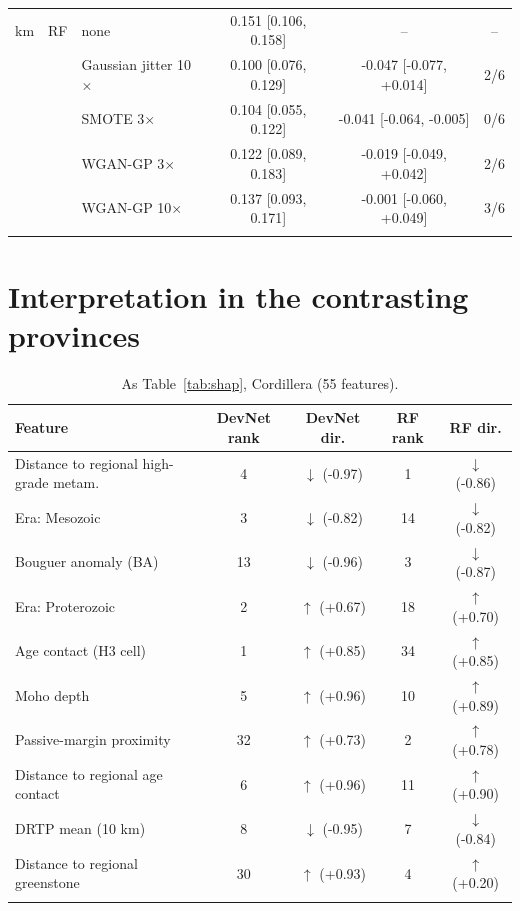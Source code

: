 \documentclass[pdflatex,sn-apa]{sn-jnl}
\begin{document}
\begin{appendices}
\begin{table}[!h]
\begin{tabular*}{\textwidth}{@{\extracolsep\fill}lllccc}
\addlinespace
200 km & RF & none & 0.151 [0.106, 0.158] & -- & -- \\
 &  & Gaussian jitter 10$\times$ & 0.100 [0.076, 0.129] & -0.047 [-0.077, +0.014] & 2/6 \\
 &  & SMOTE 3$\times$ & 0.104 [0.055, 0.122] & -0.041 [-0.064, -0.005] & 0/6 \\
 &  & WGAN-GP 3$\times$ & 0.122 [0.089, 0.183] & -0.019 [-0.049, +0.042] & 2/6 \\
 &  & WGAN-GP 10$\times$ & 0.137 [0.093, 0.171] & -0.001 [-0.060, +0.049] & 3/6 \\
\botrule
\end{tabular*}
\end{table}

\clearpage
\section{Interpretation in the contrasting provinces}\label{app:shap}

\begin{table}[!h]
\caption{As Table~\ref{tab:shap}, Cordillera (55 features).}\label{tab:shap-cord}
\footnotesize
\begin{tabular*}{\textwidth}{@{\extracolsep\fill}lcccc}
\toprule
Feature & DevNet rank & DevNet dir. & RF rank & RF dir. \\
\midrule
Distance to regional high-grade metam. & 4 & $\downarrow$ (-0.97) & 1 & $\downarrow$ (-0.86) \\
Era: Mesozoic & 3 & $\downarrow$ (-0.82) & 14 & $\downarrow$ (-0.82) \\
Bouguer anomaly (BA) & 13 & $\downarrow$ (-0.96) & 3 & $\downarrow$ (-0.87) \\
Era: Proterozoic & 2 & $\uparrow$ (+0.67) & 18 & $\uparrow$ (+0.70) \\
Age contact (H3 cell) & 1 & $\uparrow$ (+0.85) & 34 & $\uparrow$ (+0.85) \\
Moho depth & 5 & $\uparrow$ (+0.96) & 10 & $\uparrow$ (+0.89) \\
Passive-margin proximity & 32 & $\uparrow$ (+0.73) & 2 & $\uparrow$ (+0.78) \\
Distance to regional age contact & 6 & $\uparrow$ (+0.96) & 11 & $\uparrow$ (+0.90) \\
DRTP mean (10 km) & 8 & $\downarrow$ (-0.95) & 7 & $\downarrow$ (-0.84) \\
Distance to regional greenstone & 30 & $\uparrow$ (+0.93) & 4 & $\uparrow$ (+0.20) \\
\botrule
\end{tabular*}
\end{table}


\end{appendices}
\end{document}
